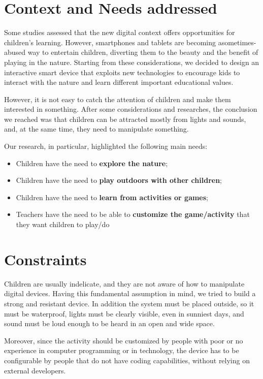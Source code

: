 \documentclass[a4paper,11pt]{report}
\begin{document}
\section{Context and Needs addressed}
Some studies assessed that the new digital context offers opportunities for children's learning. However, smartphones and tablets are becoming a\linebreak[4] sometimes-abused way to entertain children, diverting them to the beauty and the benefit of playing in the nature. Starting from these considerations, we decided to design an interactive smart device that exploits new technologies to encourage kids to interact with the nature and learn different important educational values.\par
However, it is not easy to catch the attention of children and make them interested in something. After some considerations and researches, the conclusion we reached was that children can be attracted mostly from lights and sounds, and, at the same time, they need to manipulate something.\par
Our research, in particular, highlighted the following main needs:
\begin{itemize}
	\item Children have the need to \textbf{explore the nature};
	\item Children have the need to \textbf{play outdoors with other children};
	\item Children have the need to \textbf{learn from activities or games};
	\item Teachers have the need to be able to \textbf{customize the game/activity} that they want children to play/do
\end{itemize}
\section{Constraints}
Children are usually indelicate, and they are not aware of how to manipulate digital devices. Having this fundamental assumption in mind, we tried to build a strong and resistant device. In addition the system must be placed outside, so it must be waterproof, lights must be clearly visible, even in sunniest days, and sound must be loud enough to be heard in an open and wide space.\par
Moreover, since the activity should be customized by people with poor or no experience in computer programming or in technology, the device has to be configurable by people that do not have coding capabilities, without relying on external developers.
\end{document}
